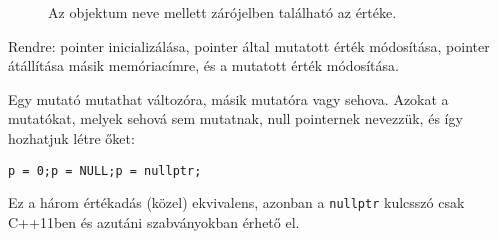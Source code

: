 \documentclass[a4paper,11.5pt,table]{article}
\begin{document}
\begin{figure}[!h]
		
		\smallskip
		Az objektum neve mellett zárójelben található az értéke.
	\end{figure}
	Rendre: pointer inicializálása, pointer által mutatott érték módosítása, pointer átállítása másik memóriacímre, és a mutatott érték módosítása.
	
	Egy mutató mutathat változóra, másik mutatóra vagy sehova. Azokat a mutatókat, melyek sehová sem mutatnak, null pointernek nevezzük, és így hozhatjuk létre őket:
	
	{\centering \texttt{p = 0;\quad \quad p = NULL;\quad \quad p = nullptr;} \par}
	\begin{note}
		Ez a három értékadás (közel) ekvivalens, azonban a \texttt{nullptr} kulcsszó csak C++11ben és azutáni szabványokban érhető el.
	\end{note}
\end{document}
